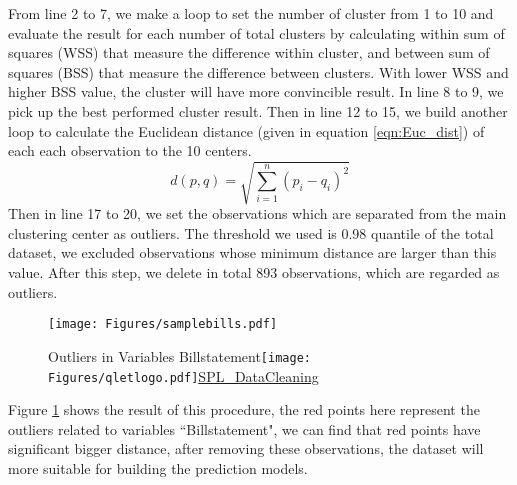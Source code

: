 \documentclass[a4paper,11pt]{article}
\begin{document}
From line 2 to 7, we make a loop to set the number of cluster from 1 to 10 and evaluate the result for each number of total clusters by calculating within sum of squares (WSS) that measure the difference within cluster, and between sum of squares (BSS) that measure the difference between clusters. With lower WSS and higher BSS value, the cluster will have more convincible result. \cite{brun2007model} In line 8 to 9, we pick up the best performed cluster result. Then in line 12 to 15, we build another loop to calculate the Euclidean distance (given in equation  \ref{eqn:Euc_dist}) of each each observation to the 10 centers.
\begin{equation}
 d(p,q)=\sqrt{\sum\limits_{i=1}^{n}(p_i-q_i)^2}
\label{eqn:Euc_dist}
\end{equation}
Then in line 17 to 20, we set the observations which are separated from the main clustering center as outliers. The threshold we used is 0.98 quantile of the total dataset, we excluded observations whose minimum distance are larger than this value. After this step, we delete in total 893 observations, which are regarded as outliers.
 \begin{figure}[!ht] 
	\centering\texttt{[image: Figures/samplebills.pdf]} 
	\caption{Outliers in Variables Billstatement\protect\texttt{[image: Figures/qletlogo.pdf]}\href{https://github.com/Jingmin24/R-programming/tree/master/SPL_Datacleaning}{SPL\_DataCleaning}}\label{fig:samplebill} 
\end{figure}

Figure \ref{fig:samplebill} shows the result of this procedure, the red points here represent the outliers related to variables ``Billstatement", we can find that red points have significant bigger distance, after removing these observations, the dataset will more suitable for building the prediction models.
\end{document}
